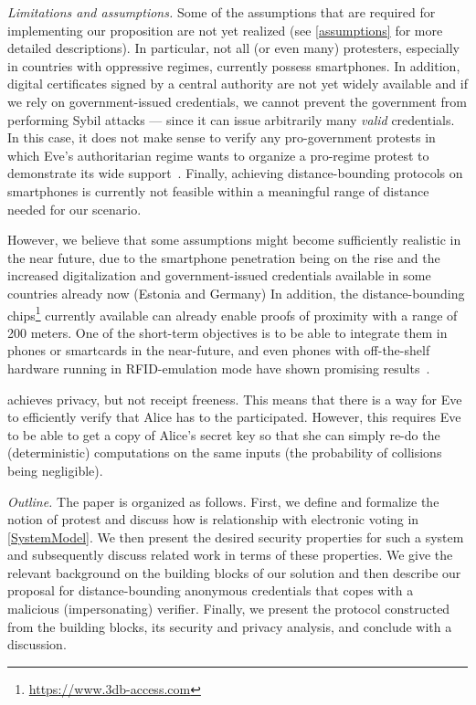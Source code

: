 \emph{Limitations and assumptions.} Some of the assumptions that are required for implementing our proposition are not yet realized (see \cref{assumptions} for more detailed descriptions). 
In particular, not all (or even many) protesters, especially in countries with oppressive regimes, currently possess smartphones.
In addition, digital certificates signed by a central authority are not yet widely available and if we rely on government-issued credentials, we cannot prevent the government from performing Sybil attacks --- since it can issue arbitrarily many \emph{valid} credentials. 
In this case, it does not make sense to verify any pro-government protests in which Eve's authoritarian regime wants to organize a pro-regime protest to demonstrate its wide support~\cite[e.g.][]{AlJazeeraOnVenezuela2017,VenezuelanStateWorkersCalledToParticipate}.
Finally, achieving distance-bounding protocols on smartphones is currently not feasible within a meaningful range of distance needed for our scenario. 

However, we believe that some assumptions might become sufficiently realistic in the near future, due to the smartphone penetration being on the rise and the increased digitalization and government-issued credentials available in some countries already now (\eg Estonia and Germany)
In addition, the distance-bounding chips\footnote{\url{https://www.3db-access.com}} currently available can already enable proofs of proximity with a range of 200 meters.
One of the short-term objectives is to be able to integrate them in phones or smartcards in the near-future, and even phones with off-the-shelf hardware running in RFID-emulation mode have shown promising results~\cite{DBonSmartphones}.

\PRIVO achieves privacy, but not receipt freeness.
This means that there is a way for Eve to efficiently verify that Alice has to the participated.
However, this requires Eve to be able to get a copy of Alice's secret key so that she can simply re-do the (deterministic) computations on the same inputs (the probability of collisions being negligible).

\emph{Outline.} The paper is organized as follows. 
First, we define and formalize the notion of protest and discuss how is relationship with electronic voting in \cref{SystemModel}.  
We then present the desired security properties for such a system and subsequently discuss related work in terms of these properties. 
We give the relevant background on the building blocks of our solution \PRIVO and then describe our proposal for distance-bounding anonymous credentials that copes with a malicious (impersonating) verifier. 
Finally, we present the protocol constructed from the building blocks, its security and privacy analysis, and conclude with a discussion. 